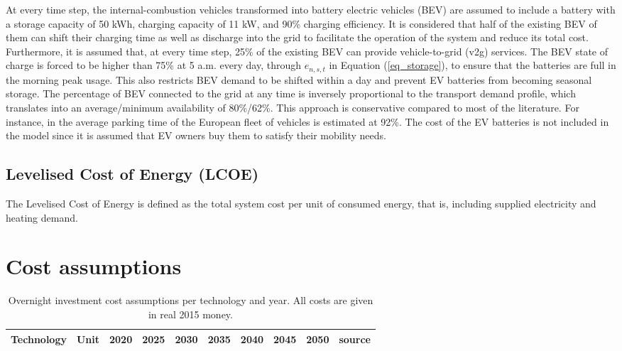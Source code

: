 \documentclass[3p]{elsarticle} %
\begin{document}
At every time step, the internal-combustion vehicles transformed into battery electric vehicles (BEV) are assumed to include a battery with a storage capacity of 50 kWh, charging capacity of 11 kW, and 90\% charging efficiency. It is considered that half of the existing BEV of them can shift their charging time as well as discharge into the grid to facilitate the operation of the system and reduce its total cost. Furthermore, it is assumed that, at every time step, 25\% of the existing BEV can provide vehicle-to-grid (v2g) services. The BEV state of charge is forced to be higher than 75\% at 5 a.m. every day, through $e_{n,s,t}$ in Equation (\ref{eq_storage}), to ensure that the batteries are full in the morning peak usage. This also restricts BEV demand to be shifted within a day and prevent EV batteries from becoming seasonal storage. The percentage of BEV connected to the grid at any time is inversely proportional to the transport demand profile, which translates into an average/minimum availability of 80\%/62\%. This approach is conservative compared to most of the literature. For instance, in \cite{circular_economy} the average parking time of the European fleet of vehicles is estimated at 92\%. The cost of the EV batteries is not included in the model since it is assumed that EV owners buy them to satisfy their mobility needs. 


\subsection{Levelised Cost of Energy (LCOE)}

The Levelised Cost of Energy is defined as the total system cost per unit of consumed energy, that is, including supplied electricity and heating demand. \\

\section{Cost assumptions}	

\begin{table}[!h]
\footnotesize
\centering
\begin{threeparttable}
\caption{Overnight investment cost assumptions per technology and year. All costs are given in real 2015 money. } \label{tab:cost per year}
\centering
\begin{tabularx}{18cm}{lccccccccr}
\toprule
Technology & Unit & 2020 & 2025 & 2030 & 2035 & 2040 & 2045 & 2050 & source\\
\midrule

\bottomrule
\end{tabularx}
\end{threeparttable}
\end{table}
\end{document}
